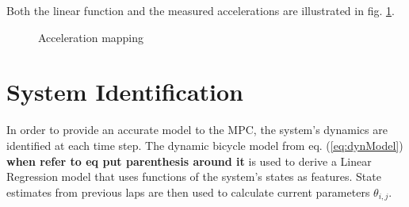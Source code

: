 Both the linear function and the measured accelerations are illustrated in fig. \ref{fig:v_over_u}.

\begin{figure}[ht]
    \centering
      
    \caption{Acceleration mapping}
    \label{fig:v_over_u}
\end{figure}



\section{System Identification}
In order to provide an accurate model to the MPC, the system's dynamics are identified at each time step. The dynamic bicycle model from eq. (\ref{eq:dynModel}) {\bfseries{when refer to eq put parenthesis around it}} is used to derive a Linear Regression model that uses functions of the system's states as features. State estimates from previous laps are then used to calculate current parameters $\theta_{i,j}$.

